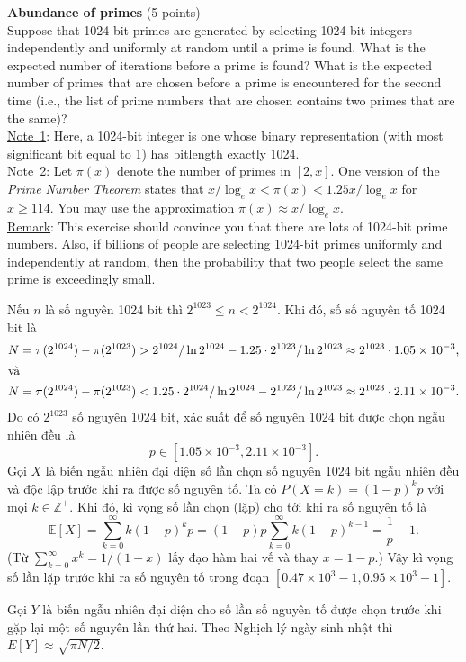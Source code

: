 \begin{problem}{\bf Abundance of primes} (5 points)\\
Suppose that 1024-bit primes are generated by selecting 1024-bit integers
independently and uniformly at random until a prime is found.
What is the expected number of iterations before a prime is found?
What is the expected number of primes that are chosen before a
prime is encountered for the second time (i.e., the list of prime
numbers that are chosen contains two primes that are the same)?\\
\underline{Note~1}: Here, a 1024-bit integer is one whose binary representation
(with most significant bit equal to 1) has bitlength exactly 1024.\\
\underline{Note~2}: Let $\pi(x)$ denote the number of primes in $[2,x]$.
One version of the \emph{Prime Number Theorem} states that
$x/\log_e x < \pi(x) < 1.25x/\log_e x$ for $x \geq 114$.
You may use the approximation $\pi(x) \approx x/\log_e x$.\\
\underline{Remark}: This exercise should convince you that there are lots
of 1024-bit prime numbers. Also, if billions of people are selecting
1024-bit primes uniformly and independently at random, then the probability
that two people select the same prime is exceedingly small.
\end{problem}

\begin{loigiai}
Nếu $n$ là số nguyên 1024 bit thì $2^{1023} \le n < 2^{1024}$. Khi đó, số số nguyên tố 1024 bit là \begin{align*}
N = \pi(2^{1024}) - \pi(2^{1023}) &> 2^{1024}/\ln{2^{1024}} - 1.25\cdot 2^{1023}/\ln{2^{1023}} \approx 2^{1023}\cdot
1.05\times10^{-3},\\
\intertext{và}
N = \pi(2^{1024}) - \pi(2^{1023}) &< 1.25\cdot 2^{1024}/\ln{2^{1024}} - 2^{1023}/\ln{2^{1023}} \approx 2^{1023}\cdot
2.11\times 10^{-3}.
\end{align*} Do có $2^{1023}$ số nguyên 1024 bit, xác suất để số nguyên 1024 bit được chọn ngẫu nhiên đều là
\begin{equation*}
p \in [1.05\times 10^{-3}, 2.11\times 10^{-3}].
\end{equation*} Gọi $X$ là biến ngẫu nhiên đại diện số lần chọn số nguyên 1024 bit ngẫu nhiên đều và độc lập trước khi
ra được số nguyên tố. Ta có $P(X = k) = (1 - p)^{k}p$ với mọi $k \in \mathbb{Z}^+$. Khi đó, kì vọng số lần chọn
(lặp) cho tới khi ra số nguyên tố là \begin{equation*}
\mathbb{E}[X] = \sum_{k = 0}^\infty k(1 - p)^{k}p = (1-p)p \sum_{k = 0}^\infty k(1-p)^{k - 1} = \frac{1}{p} - 1.
\end{equation*}(Từ $\sum_{k = 0}^\infty x^k = 1/(1 - x)$ lấy đạo hàm hai vế và thay $x = 1 - p$.) Vậy kì vọng số lần lặp
trước khi ra số nguyên tố trong đoạn $[0.47\times 10^3 - 1, 0.95 \times 10^{3} - 1]$.

Gọi $Y$ là biến ngẫu nhiên đại diện cho số lần số nguyên tố được chọn trước khi gặp lại một số nguyên lần thứ hai. Theo
Nghịch lý ngày sinh nhật thì $E[Y] \approx \sqrt{\pi N / 2}$.
\end{loigiai}
